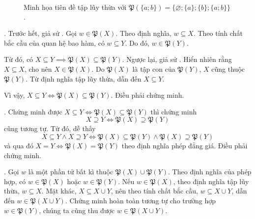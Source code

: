 \begin{figure}[H]
\begin{center}
    \end{center}
    \caption{Minh họa tiên đề tập lũy thừa với $\mathfrak{P}\left(\{a; b\}\right) = \big\{\varnothing; \{a\}; \{b\}; \{a; b\}\big\}$.}
\end{figure}


. Trước hết, giả sử . Gọi $w \in \mathfrak{P}(X)$. Theo định nghĩa, $w \subseteq X$. Theo tính chất bắc cầu của quan hệ bao hàm, có $w \subseteq Y$. Do đó, $w \in \mathfrak{P}(Y)$.

Từ đó, có $X \subseteq Y \implies \mathfrak{P}(X) \subseteq \mathfrak{P}(Y)$. Ngược lại, giả sử . Hiển nhiên rằng $X \subseteq X$, cho nên $X \in \mathfrak{P}(X)$. Do $\mathfrak{P}(X)$ là tập con của $\mathfrak{P}(Y)$, $X$ cũng thuộc $\mathfrak{P}(Y)$. Từ định nghĩa tập lũy thừa, dẫn đến $X \subseteq Y$.

Vì vậy, $X \subseteq Y \iff \mathfrak{P}(X) \subseteq \mathfrak{P}(Y)$. Điều phải chứng minh.

. Chứng minh được $X \subseteq Y \iff \mathfrak{P}(X) \subseteq \mathfrak{P}(Y)$ thì chứng minh \begin{equation*}
   X \supseteq Y \iff \mathfrak{P}(X) \supseteq \mathfrak{P}(Y)
\end{equation*}
cũng tương tự. Từ đó, dễ thấy 
\begin{equation*}
   X \subseteq Y \land X \supseteq Y \iff \mathfrak{P}(X) \subseteq \mathfrak{P}(Y) \land \mathfrak{P}(X) \supseteq \mathfrak{P}(Y)
\end{equation*}
và qua đó $X = Y \iff \mathfrak{P}(X) = \mathfrak{P}(Y)$ theo định nghĩa phép đẳng giá. Điều phải chứng minh.

. Gọi $w$ là một phần tử bất kì thuộc $\mathfrak{P}(X) \cup \mathfrak{P}(Y)$. Theo định nghĩa của phép hợp, có $w \in \mathfrak{P}(X)$ hoặc $w \in \mathfrak{P}(Y)$.
Nếu $w \in \mathfrak{P}(X)$, theo định nghĩa tập lũy thừa, $w \subseteq X$. Mặt khác, $X \subseteq X \cup Y$, nên theo tính chất bắc cầu, $w \subseteq X \cup Y$, dẫn đến $w \in \mathfrak{P}(X \cup Y)$. Chứng minh hoàn toàn tương tự cho trường hợp $w \in \mathfrak{P}(Y)$, chúng ta cũng thu được $w \in \mathfrak{P}(X \cup Y)$.

